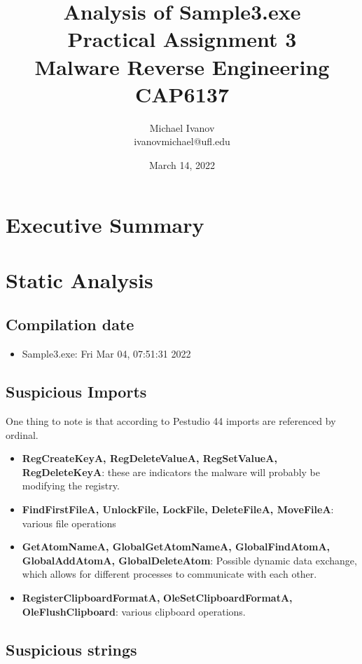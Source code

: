 \documentclass{article}
\title{Analysis of Sample3.exe \\Practical Assignment 3\\Malware Reverse Engineering \\
CAP6137}
\author{Michael Ivanov \\
ivanovmichael@ufl.edu}
\date{March 14, 2022}
\begin{document}
    \maketitle
    \pagebreak
    \section{Executive Summary}
    \pagebreak
    \section{Static Analysis}
    \subsection{Compilation date}
    \begin{itemize}
        \item Sample3.exe: Fri Mar 04, 07:51:31 2022
    \end{itemize}
    \subsection{Suspicious Imports}
    One thing to note is that according to Pestudio 44 imports are referenced by ordinal.
    \begin{itemize}
        \item \textbf{RegCreateKeyA, RegDeleteValueA, RegSetValueA, RegDeleteKeyA}: these are indicators the malware will probably be modifying the registry.
        \item \textbf{FindFirstFileA, UnlockFile, LockFile, DeleteFileA, MoveFileA}: various file operations
        \item \textbf{GetAtomNameA, GlobalGetAtomNameA, GlobalFindAtomA, GlobalAddAtomA, GlobalDeleteAtom}: Possible dynamic data exchange, which allows for different processes to communicate with each other. \cite{atom}
        \item \textbf{RegisterClipboardFormatA,} \textbf{OleSetClipboardFormatA,} \textbf{OleFlushClipboard}: various clipboard operations.
    \end{itemize}
    \subsection{Suspicious strings}
    \pagebreak
    \printbibliography
\end{document}
